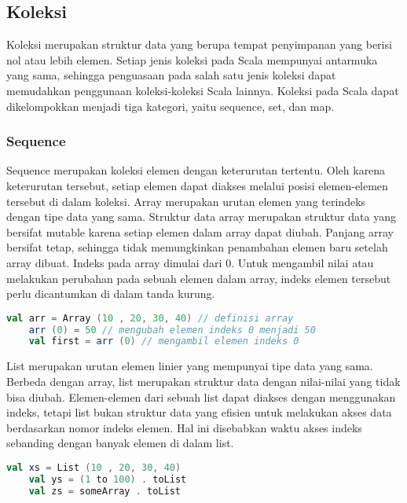 \subsection{Koleksi}
Koleksi merupakan struktur data yang berupa tempat penyimpanan yang berisi nol atau lebih
elemen. Setiap jenis koleksi pada Scala mempunyai antarmuka yang sama, sehingga penguasaan
pada salah satu jenis koleksi dapat memudahkan penggunaan koleksi-koleksi Scala lainnya. Koleksi
pada Scala dapat dikelompokkan menjadi tiga kategori, yaitu sequence, set, dan map.\newline

\subsubsection{Sequence}
Sequence merupakan koleksi elemen dengan keterurutan tertentu. Oleh karena keterurutan tersebut,
setiap elemen dapat diakses melalui posisi elemen-elemen tersebut di dalam koleksi.
Array merupakan urutan elemen yang terindeks dengan tipe data yang sama. Struktur data
array merupakan struktur data yang bersifat mutable karena setiap elemen dalam array dapat
diubah. Panjang array bersifat tetap, sehingga tidak memungkinkan penambahan elemen baru
setelah array dibuat. Indeks pada array dimulai dari 0. Untuk mengambil nilai atau melakukan
perubahan pada sebuah elemen dalam array, indeks elemen tersebut perlu dicantumkan di dalam
tanda kurung.

\begin{lstlisting}[language=Scala, caption= Contoh penggunaan array]
	val arr = Array (10 , 20, 30, 40) // definisi array
	arr (0) = 50 // mengubah elemen indeks 0 menjadi 50
	val first = arr (0) // mengambil elemen indeks 0
\end{lstlisting}

List merupakan urutan elemen linier yang mempunyai tipe data yang sama. Berbeda dengan
array, list merupakan struktur data dengan nilai-nilai yang tidak bisa diubah. Elemen-elemen dari
sebuah list dapat diakses dengan menggunakan indeks, tetapi list bukan struktur data yang efisien
untuk melakukan akses data berdasarkan nomor indeks elemen. Hal ini disebabkan waktu akses
indeks sebanding dengan banyak elemen di dalam list.

\begin{lstlisting}[language=Scala, caption= Macam-macam cara pembuatan list]
	val xs = List (10 , 20, 30, 40)
	val ys = (1 to 100) . toList
	val zs = someArray . toList
\end{lstlisting}


